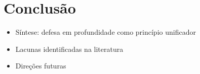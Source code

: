 {
\color{olive}

\section{
    Conclusão
} \label{sec:conclusao}

\begin{itemize}
    \item Síntese: defesa em profundidade como princípio unificador
    \item Lacunas identificadas na literatura
    \item Direções futuras
\end{itemize}

}